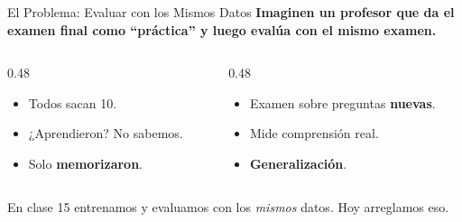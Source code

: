 \documentclass[aspectratio=169, 11pt]{beamer}
\begin{document}
\begin{frame}{El Problema: Evaluar con los Mismos Datos}
  \vspace{-4pt}
  {\footnotesize\color{arcaDark}\bfseries
    Imaginen un profesor que da el examen final como ``práctica'' y
    luego evalúa con \textbf{el mismo examen}.}

  \vspace{8pt}
  \begin{columns}[T]
    \begin{column}{0.48\textwidth}
      \begin{tcolorbox}[colback=arcaRed!8, colframe=arcaRed, boxrule=0.5pt,
        arc=2pt, left=6pt, right=6pt, top=4pt, bottom=4pt,
        title={\small\color{white}\bfseries\faTimesCircle\ Lo que NO queremos}]
        {\scriptsize
        \begin{itemize}\setlength{\itemsep}{2pt}
          \item Todos sacan 10.
          \item ¿Aprendieron? No sabemos.
          \item Solo \textbf{memorizaron}.
        \end{itemize}
        }
      \end{tcolorbox}
    \end{column}
    \begin{column}{0.48\textwidth}
      \begin{tcolorbox}[colback=codeGreen!8, colframe=codeGreen, boxrule=0.5pt,
        arc=2pt, left=6pt, right=6pt, top=4pt, bottom=4pt,
        title={\small\color{white}\bfseries\faCheckCircle\ Lo que queremos}]
        {\scriptsize
        \begin{itemize}\setlength{\itemsep}{2pt}
          \item Examen sobre preguntas \textbf{nuevas}.
          \item Mide comprensión real.
          \item \textbf{Generalización}.
        \end{itemize}
        }
      \end{tcolorbox}
    \end{column}
  \end{columns}

  \vspace{8pt}
  {\footnotesize\color{arcaDark}
    \faArrowRight\hspace{4pt} En clase 15 entrenamos y evaluamos con los
    \textit{mismos} datos. Hoy arreglamos eso.}
\end{frame}
\end{document}
